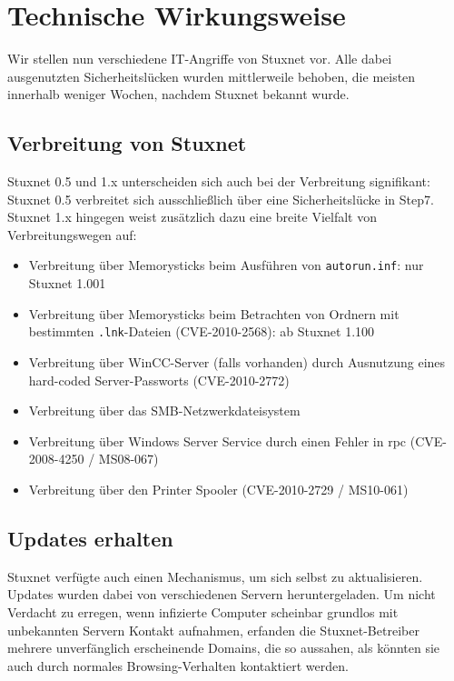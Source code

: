 \documentclass[a4paper]{article}
\begin{document}
\section{Technische Wirkungsweise}

Wir stellen nun verschiedene IT-Angriffe von Stuxnet vor.
Alle dabei ausgenutzten Sicherheitslücken wurden mittlerweile behoben, die meisten innerhalb weniger Wochen, nachdem Stuxnet bekannt wurde.

\subsection{Verbreitung von Stuxnet}

Stuxnet 0.5 und 1.x unterscheiden sich auch bei der Verbreitung signifikant:
Stuxnet 0.5 verbreitet sich ausschließlich über eine Sicherheitslücke in Step7.
Stuxnet 1.x hingegen weist zusätzlich dazu eine breite Vielfalt von Verbreitungswegen auf:

\begin{itemize}
\item Verbreitung über Memorysticks beim Ausführen von \texttt{autorun.inf}: nur Stuxnet 1.001\cite{dossier} %
\item Verbreitung über Memorysticks beim Betrachten von Ordnern mit bestimmten \texttt{.lnk}-Dateien (CVE-2010-2568\cite{CVE_lnk}): ab Stuxnet 1.100
\item Verbreitung über WinCC-Server (falls vorhanden) durch Ausnutzung eines hard-coded Server-Passworts (CVE-2010-2772\cite{CVE_wincc})
\item Verbreitung über das SMB-Netzwerkdateisystem
\item Verbreitung über Windows Server Service durch einen Fehler in \gls{rpc} (CVE-2008-4250\cite{CVE_rpc} / MS08-067\cite{MS_rpc})
\item Verbreitung über den Printer Spooler (CVE-2010-2729\cite{CVE_spooler} / MS10-061\cite{MS_spooler})
\end{itemize} %

\subsection{Updates erhalten}

Stuxnet verfügte auch einen Mechanismus, um sich selbst zu aktualisieren.
Updates wurden dabei von verschiedenen Servern heruntergeladen.
Um nicht Verdacht zu erregen, wenn infizierte Computer scheinbar grundlos mit unbekannten Servern Kontakt aufnahmen,
erfanden die Stuxnet-Betreiber mehrere unverfänglich erscheinende Domains,
die so aussahen, als könnten sie auch durch normales Browsing-Verhalten kontaktiert werden.
\end{document}
